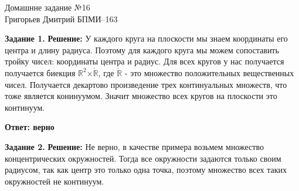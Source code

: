 \documentclass[12pt,a4paper]{scrartcl}
\begin{document}
	\begin{center}	
		Домашнне задание №16 \\
		Григорьев Дмитрий БПМИ--163
	\end{center}
	\textbf{Задание 1.}
	\newline
	\textbf{Решение:}
	\newline
	\indent
	У каждого круга на плоскости мы знаем координаты его центра и длину радиуса. Поэтому для каждого круга мы можем сопоставить тройку чисел: координаты центра и радиус. Для всех кругов у нас получается получается биекция $\mathbb{R}^2$$\times$$\acute{\mathbb{R}}$, где $\acute{\mathbb{R}}$ - это множество положительных вещественных чисел. Получается декартово произведение трех континуальных множеств, что тоже является конинуумом. Значит множество всех кругов на плоскости это континуум.
	\begin{flushright}	
		\textbf{Ответ: верно}
	\end{flushright} 
	\textbf{Задание 2.} 
	\newline
	\textbf{Решение:}
	\newline
	\indent
	Не верно, в качестве примера возьмем множество концентрических окружностей. Тогда все окружности задаются только своим радиусом, так как центр это только одна точка, поэтому множество всех таких окружностей не континуум. 
	
\end{document}

